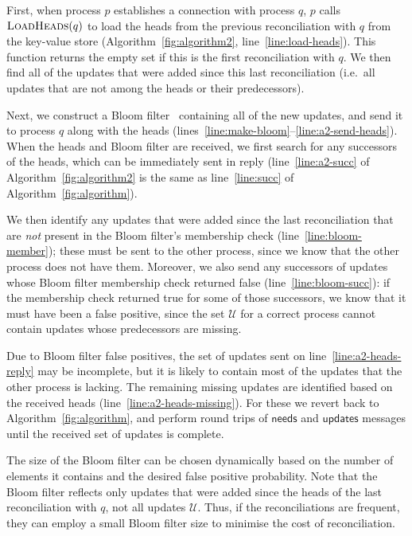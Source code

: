 \documentclass[a4paper,anonymous,USenglish]{lipics-v2019}
\begin{document}
First, when process $p$ establishes a connection with process $q$, $p$ calls $\textsc{LoadHeads}(q)$ to load the heads from the previous reconciliation with $q$ from the key-value store (Algorithm~\ref{fig:algorithm2}, line~\ref{line:load-heads}).
This function returns the empty set if this is the first reconciliation with $q$.
We then find all of the updates that were added since this last reconciliation (i.e.\ all updates that are not among the heads or their predecessors).

Next, we construct a Bloom filter~\cite{Bloom:1970} containing all of the new updates, and send it to process $q$ along with the heads (lines~\ref{line:make-bloom}--\ref{line:a2-send-heads}).
When the heads and Bloom filter are received, we first search for any successors of the heads, which can be immediately sent in reply (line~\ref{line:a2-succ} of Algorithm~\ref{fig:algorithm2} is the same as line~\ref{line:succ} of Algorithm~\ref{fig:algorithm}).

We then identify any updates that were added since the last reconciliation that are \emph{not} present in the Bloom filter's membership check (line~\ref{line:bloom-member}); these must be sent to the other process, since we know that the other process does not have them.
Moreover, we also send any successors of updates whose Bloom filter membership check returned false (line~\ref{line:bloom-succ}): if the membership check returned true for some of those successors, we know that it must have been a false positive, since the set $\mathcal{U}$ for a correct process cannot contain updates whose predecessors are missing.

Due to Bloom filter false positives, the set of updates sent on line~\ref{line:a2-heads-reply} may be incomplete, but it is likely to contain most of the updates that the other process is lacking.
The remaining missing updates are identified based on the received heads (line~\ref{line:a2-heads-missing}).
For these we revert back to Algorithm~\ref{fig:algorithm}, and perform round trips of $\mathsf{needs}$ and $\mathsf{updates}$ messages until the received set of updates is complete.

The size of the Bloom filter can be chosen dynamically based on the number of elements it contains and the desired false positive probability.
Note that the Bloom filter reflects only updates that were added since the heads of the last reconciliation with $q$, not all updates $\mathcal{U}$.
Thus, if the reconciliations are frequent, they can employ a small Bloom filter size to minimise the cost of reconciliation.
\end{document}
